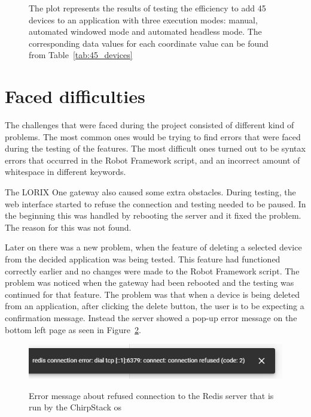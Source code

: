 \begin{figure}[H]
    \caption{The plot represents the results of testing the efficiency to add 45 devices to an application with three execution modes: manual, automated windowed mode and automated headless mode.
    The corresponding data values for each coordinate value can be found from Table~\ref{tab:45_devices}}\label{fig:45_devices}
\end{figure}

\clearpage

\section{Faced difficulties}
The challenges that were faced during the project consisted of different kind of problems.
The most common ones would be trying to find errors that were faced during the testing of the features.
The most difficult ones turned out to be syntax errors that occurred in the Robot Framework script, and an incorrect amount of whitespace in different keywords.

The LORIX One gateway also caused some extra obstacles.
During testing, the web interface started to refuse the connection and testing needed to be paused.
In the beginning this was handled by rebooting the server and it fixed the problem.
The reason for this was not found.

Later on there was a new problem, when the feature of deleting a selected device from the decided application was being tested.
This feature had functioned correctly earlier and no changes were made to the Robot Framework script.
The problem was noticed when the gateway had been rebooted and the testing was continued for that feature.
The problem was that when a device is being deleted from an application, after clicking the delete button, the user is to be expecting a confirmation message.
Instead the server showed a pop-up error message on the bottom left page as seen in Figure~\ref{fig:error_when_confirming_device_deleting}.

\begin{figure}[ht]
  \centering
  {\includegraphics[width=\textwidth]{illustration/error_when_confirming_device_deleting.PNG}}
  \caption{Error message about refused connection to the Redis server that is run by the ChirpStack \gls{os}}
  \label{fig:error_when_confirming_device_deleting}
\end{figure}

